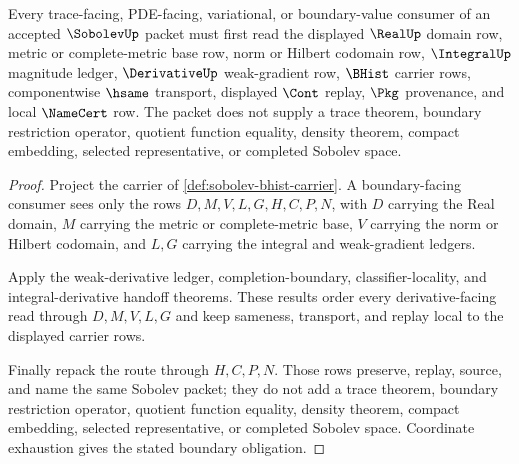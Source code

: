 \begin{theorem}
\label{thm:sobolev-trace-boundary-obligation}
Every trace-facing, PDE-facing, variational, or boundary-value consumer of an accepted $\SobolevUp$ packet must first read the displayed $\RealUp$ domain row, metric or complete-metric base row, norm or Hilbert codomain row, $\IntegralUp$ magnitude ledger, $\DerivativeUp$ weak-gradient row, $\BHist$ carrier rows, componentwise $\hsame$ transport, displayed $\Cont$ replay, $\Pkg$ provenance, and local $\NameCert$ row. The packet does not supply a trace theorem, boundary restriction operator, quotient function equality, density theorem, compact embedding, selected representative, or completed Sobolev space.
\end{theorem}
\begin{proof}
Project the carrier of \autoref{def:sobolev-bhist-carrier}. A boundary-facing consumer sees only the rows $D,M,V,L,G,H,C,P,N$, with $D$ carrying the Real domain, $M$ carrying the metric or complete-metric base, $V$ carrying the norm or Hilbert codomain, and $L,G$ carrying the integral and weak-gradient ledgers.

Apply the weak-derivative ledger, completion-boundary, classifier-locality, and integral-derivative handoff theorems. These results order every derivative-facing read through $D,M,V,L,G$ and keep sameness, transport, and replay local to the displayed carrier rows.

Finally repack the route through $H,C,P,N$. Those rows preserve, replay, source, and name the same Sobolev packet; they do not add a trace theorem, boundary restriction operator, quotient function equality, density theorem, compact embedding, selected representative, or completed Sobolev space. Coordinate exhaustion gives the stated boundary obligation.
\end{proof}
